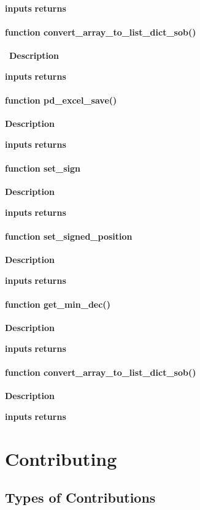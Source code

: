 \documentclass[refman]{article}
\begin{document}
\textbf{inputs}
\textbf{returns}

\paragraph{\textbf{function} convert\_array\_to\_list\_dict\_sob()}\hfill\
\noindent \textbf{Description}

\textbf{inputs}
\textbf{returns}

\paragraph{\textbf{function} pd\_excel\_save()}\hfill\break
\noindent \textbf{Description}

\textbf{inputs}
\textbf{returns}

\paragraph{\textbf{function} set\_sign}\hfill\break
\noindent \textbf{Description}

\textbf{inputs}
\textbf{returns}

\paragraph{\textbf{function} set\_signed\_position}\hfill\break
\noindent \textbf{Description}

\textbf{inputs}
\textbf{returns}

\paragraph{\textbf{function} get\_min\_dec()}\hfill\break
\noindent \textbf{Description}

\textbf{inputs}
\textbf{returns}

\paragraph{\textbf{function} convert\_array\_to\_list\_dict\_sob()}\hfill\break
\noindent \textbf{Description}

\textbf{inputs}
\textbf{returns}

\newpage
\section{Contributing}
\subsection{Types of Contributions}
\end{document}
